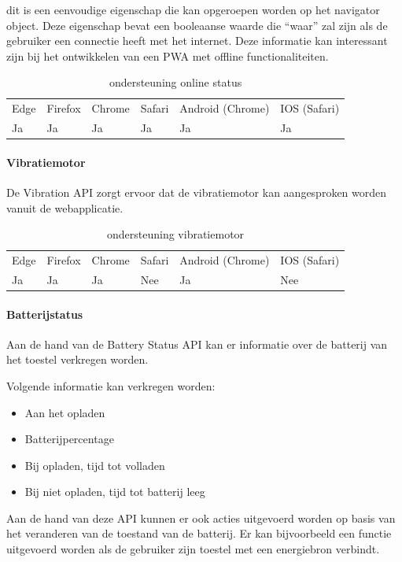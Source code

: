 dit is een eenvoudige eigenschap die kan opgeroepen worden op het navigator object. Deze eigenschap bevat een booleaanse waarde die “waar” zal zijn als de gebruiker een connectie heeft met het internet. Deze informatie kan interessant zijn bij het ontwikkelen van een PWA met offline functionaliteiten.
\begin{table}[H]
	\centering
	\begin{tabular}{llllll}
		Edge & Firefox & Chrome & Safari & Android (Chrome) & IOS (Safari) \\
		Ja   & Ja      &  Ja     & Ja     & Ja               & Ja          
	\end{tabular}	
	\caption{ondersteuning online status }
\end{table}

\paragraph{Vibratiemotor }

De Vibration API \autocite{Kostionen2020} zorgt ervoor dat de vibratiemotor kan aangesproken worden vanuit de webapplicatie.

\begin{table}[H]
	\begin{tabular}{llllll}
		Edge & Firefox & Chrome & Safari & Android (Chrome) & IOS (Safari) \\
		Ja   & Ja      &  Ja     & Nee     & Ja               & Nee          
	\end{tabular}	
	\caption{ondersteuning vibratiemotor  }
\end{table}


\paragraph{Batterijstatus}

Aan de hand van de Battery Status API \autocite{Kostiainen2020} kan er informatie over de batterij van het toestel verkregen worden.

Volgende informatie kan verkregen worden:
 \begin{itemize}
	\item	Aan het opladen
	\item	Batterijpercentage
	\item	Bij opladen, tijd tot volladen
	\item	Bij niet opladen, tijd tot batterij leeg
\end{itemize}

Aan de hand van deze API kunnen er ook acties uitgevoerd worden op basis van het veranderen van de toestand van de batterij. Er kan bijvoorbeeld een functie uitgevoerd worden als de gebruiker zijn toestel met een energiebron verbindt.

